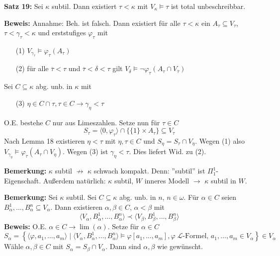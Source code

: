 \documentclass[a4paper,fontsize=11pt]{scrartcl}
\renewcommand{\bar}[1]{\overline{#1}}
\begin{document}
{\bf Satz 19:} Sei $\kappa$ subtil. Dann existiert $\tau<\kappa$ mit $V_{\kappa}\models\tau$ ist total unbeschreibbar.

  {\bf Beweis:} Annahme: Beh. ist falsch.
    Dann existiert für alle $\tau<\kappa$ ein $A_{\tau}\subseteq V_{\tau}$, $\tau<\gamma_{\tau}<\kappa$ und erststufiges $\varphi_{\tau}$ mit
    \begin{enumerate}
      \item[(1)] $V_{\gamma_{\tau}} \models \varphi_{\tau}(A_{\tau})$
      \item[(2)] für alle $\bar\tau<\tau$ und $\bar\tau <\delta<\tau$ gilt $V_{\delta}\models \neg\varphi_{\tau}(A_{\tau}\cap V_{\bar\tau})$
    \end{enumerate}
    Sei $C\subseteq \kappa$ abg. unb. in $\kappa$ mit 
    \begin{enumerate}
      \item[(3)] $\eta \in C\cap\tau, \tau\in C\to \gamma_{\eta}<\tau$
    \end{enumerate}
    O.E. bestehe $C$ nur aus Limeszahlen.
    Setze nun für $\tau\in C$
    $$S_{\tau}=\langle 0,\varphi_{\tau}\rangle \cap \{\{1\}\times A_{\tau}\}\subseteq V_{\tau}$$
    Nach Lemma 18 existieren $\eta<\tau$ mit $\eta,\tau\in C$ und $S_{\eta}=S_{\tau}\cap V_{\eta}$.
    Wegen (1) also $V_{\gamma_{\eta}}\models\varphi_{\tau}(A_{\tau}\cap V_{\eta})$.
    Wegen (3) ist $\gamma_{\eta}<\tau$.
    Dies liefert Wid. zu (2).

{\bf Bemerkung:} $\kappa$ subtil $\not\to$ $\kappa$ schwach kompakt.
  Denn: ''subtil'' ist $\Pi^1_1$-Eigenschaft. Außerdem natürlich:  
  $\kappa$ subtil, $W$ inneres Modell $\to$ $\kappa$ subtil in $W$.
  
{\bf Bemerkung:} Sei $\kappa$ subtil.
  Sei $C\subseteq\kappa$ abg. unb. in $n$, $n\in\omega$.
  Für $\alpha\in C$ seien $B_{\alpha}^1,\ldots, B_{\alpha}^n\subseteq V_{\alpha}$.
  Dann existieren $\alpha,\beta\in C$, $\alpha<\beta$ mit
  $$\langle V_{\alpha},B_{\alpha}^1,\ldots,B_{\alpha}^n\rangle\prec\langle V_{\beta}, B_{\beta}^1,\ldots,B_{\beta}^n\rangle$$
  {\bf Beweis:} O.E. $\alpha\in C\to \lim(\alpha)$.
    Setze für $\alpha\in C$ $$S_{\alpha}=\left\{\langle\varphi,a_1,\ldots,a_m\rangle\mid \langle V_{\alpha},B_{\alpha}^1,\ldots,B_{\alpha}^n\rangle\models\varphi[a_1,\ldots,a_m], \varphi\; \mathcal L\mbox{-Formel, } a_1,\ldots,a_m\in V_{\alpha}\right\}\in V_{\alpha}$$
    Wähle $\alpha,\beta\in C$ mit $S_{\alpha}=S_{\beta}\cap V_{\alpha}$.
    Dann sind $\alpha, \beta$ wie gewünscht.
  
\end{document}
